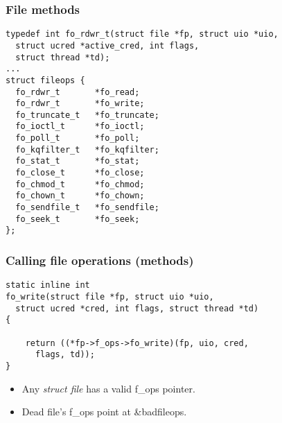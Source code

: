 \documentclass{beamer}
\begin{document}
\begin{frame}[fragile]
\frametitle{File methods}
\small\begin{verbatim}
typedef int fo_rdwr_t(struct file *fp, struct uio *uio,
  struct ucred *active_cred, int flags,
  struct thread *td);
...
struct fileops {
  fo_rdwr_t       *fo_read;
  fo_rdwr_t       *fo_write;
  fo_truncate_t   *fo_truncate;
  fo_ioctl_t      *fo_ioctl;
  fo_poll_t       *fo_poll;
  fo_kqfilter_t   *fo_kqfilter;
  fo_stat_t       *fo_stat;
  fo_close_t      *fo_close;
  fo_chmod_t      *fo_chmod;
  fo_chown_t      *fo_chown;
  fo_sendfile_t   *fo_sendfile;
  fo_seek_t       *fo_seek;
};
\end{verbatim}
\end{frame}


\begin{frame}[fragile]
\frametitle{Calling file operations (methods)}
\small\begin{verbatim}
static inline int
fo_write(struct file *fp, struct uio *uio,
  struct ucred *cred, int flags, struct thread *td)
{

    return ((*fp->f_ops->fo_write)(fp, uio, cred,
      flags, td));
}
\end{verbatim}
 {
\begin{itemize}
  \item{Any \emph{struct file} has a valid f\_ops pointer.}
  \item{Dead file's f\_ops point at \&badfileops.}
\end{itemize}
}
\end{frame}


\begin{frame}[fragile]
\frametitle{a vnode(9) backed file}
\small\begin{verbatim}
struct vnode {
  ...
  enum    vtype v_type;         /* vnode type */
  struct  vop_vector *v_op;     /* vnode operations vector */
  void    *v_data;              /* private data for fs */
  struct  mount *v_mount;       /* ptr to vfs we are in */
  int     v_usecount;           /* ref count of users */
  int     v_holdcnt;            /* prevents recycling. */
  struct bufobj   v_bufobj;     /* Buffer cache object */
  ...
}
\end{verbatim}}
\end{frame}
\end{document}
